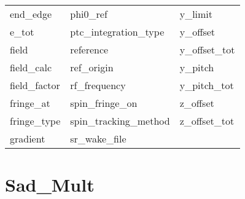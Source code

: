 \begin{tabular}{lll}
end_edge                    & phi0_ref                    & y_limit                     \\
e_tot                       & ptc_integration_type        & y_offset                    \\
field                       & reference                   & y_offset_tot                \\
field_calc                  & ref_origin                  & y_pitch                     \\
field_factor                & rf_frequency                & y_pitch_tot                 \\
fringe_at                   & spin_fringe_on              & z_offset                    \\
fringe_type                 & spin_tracking_method        & z_offset_tot                \\
gradient                    & sr_wake_file                &                             \\
 \bottomrule
 \end{tabular}
 \vfill
 
 \section{Sad_Mult}
 \label{s:list.sad.mult}
 
